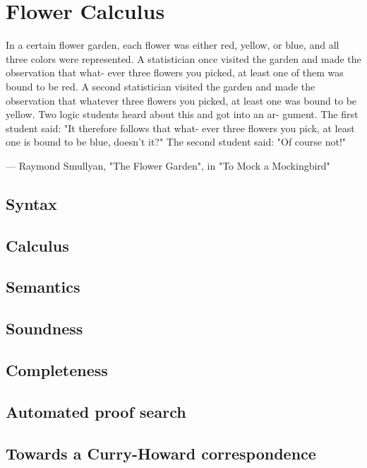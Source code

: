 \setchapterpreamble[u]{\margintoc}
\chapter{Flower Calculus}


In a certain flower garden, each flower was either red, yellow,
or blue, and all three colors were represented. A statistician
once visited the garden and made the observation that what-
ever three flowers you picked, at least one of them was bound
to be red. A second statistician visited the garden and made
the observation that whatever three flowers you picked, at
least one was bound to be yellow.
Two logic students heard about this and got into an ar-
gument. The first student said: "It therefore follows that what-
ever three flowers you pick, at least one is bound to be blue,
doesn't it?" The second student said: "Of course not!"

--- Raymond Smullyan, "The Flower Garden", in "To Mock a Mockingbird"

\section{Syntax}

\section{Calculus}

\section{Semantics}

\section{Soundness}

\section{Completeness}

\section{Automated proof search}

\section{Towards a Curry-Howard correspondence}